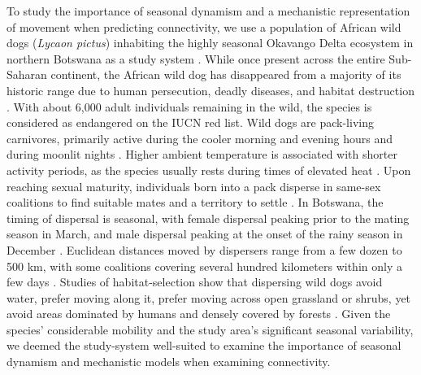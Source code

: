 \documentclass[abstract=on,10pt,a4paper,bibliography=totocnumbered]{article}
\begin{document}
To study the importance of seasonal dynamism and a mechanistic representation of
movement when predicting connectivity, we use a population of African wild dogs
(\textit{Lycaon pictus}) inhabiting the highly seasonal Okavango Delta ecosystem
in northern Botswana as a study system \citep{McNutt.1996}. While once present
across the entire Sub-Saharan continent, the African wild dog has disappeared
from a majority of its historic range due to human persecution, deadly diseases,
and habitat destruction \citep{Woodroffe.2020a}. With about 6,000 adult
individuals remaining in the wild, the species is considered as endangered on
the IUCN red list. Wild dogs are pack-living carnivores, primarily active during
the cooler morning and evening hours \citep{Rasmussen.2012} and during moonlit
nights \citep{Cozzi.2012}. Higher ambient temperature is associated with shorter
activity periods, as the species usually rests during times of elevated heat
\citep{Rabaiotti.2019}. Upon reaching sexual maturity, individuals born into a
pack disperse in same-sex coalitions to find suitable mates and a territory to
settle \citep{McNutt.1996}. In Botswana, the timing of dispersal is seasonal,
with female dispersal peaking prior to the mating season in March, and male
dispersal peaking at the onset of the rainy season in December
\citep{Behr.2020}. Euclidean distances moved by dispersers range from a few
dozen to 500 km, with some coalitions covering several hundred kilometers within
only a few days \citep{Davies-Mostert.2012, Masenga.2016, Cozzi.2020,
Sandoval-Seres.2022}. Studies of habitat-selection show that dispersing wild
dogs avoid water, prefer moving along it, prefer moving across open grassland or
shrubs, yet avoid areas dominated by humans and densely covered by forests
\citep{ONeill.2020, Hofmann.2021}. Given the species' considerable mobility and
the study area's significant seasonal variability, we deemed the study-system
well-suited to examine the importance of seasonal dynamism and mechanistic
models when examining connectivity.
\end{document}

